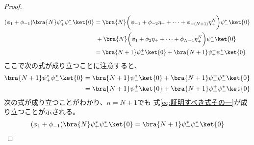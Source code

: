 {\begin{proof}
\begin{equation*}
\begin{split}
			(\phi_1 + \phi_{-1})\bra{N}\psi_+^*\psi_-^*\ket{0}
			&= \bra{N}\biggl(\phi_{-1} + \phi_{-2}\eta_+
				+\cdots+ \phi_{-(N+1)}\eta_+^N\biggr)\psi_-^*\ket{0} \\
			&\; + \bra{N}\biggl(\phi_1 + \phi_2\eta_+
				+\cdots+ \phi_{N+1}\eta_+^N\biggr)\psi_-^*\ket{0} \\
			&= \bra{N+1}\psi_-^+\ket{0}
				+ \bra{N+1}\psi_+^+\psi_-^*\ket{0} \\
		\end{split}\end{equation*}
		ここで次の式が成り立つことに注意すると、
		\begin{equation*}\begin{split}
			\bra{N+1}\psi_+^*\psi_-^*\ket{0} &= \bra{N+1}\psi_-^*\ket{0}
				+ \bra{N+1}\psi_+^+\psi_-^*\ket{0} \\
			&= \bra{N+1}\psi_-^+\ket{0} + \bra{N+1}\psi_+^+\psi_-^*\ket{0} \\
		\end{split}\end{equation*}
		次の式が成り立つことがわかり、$n=N+1$でも
		式\eqref{eq:証明すべき式その一}が成り立つことが示される。
		\begin{equation*}\begin{split}
			(\phi_1 + \phi_{-1})\bra{N}\psi_+^*\psi_-^*\ket{0}
			= \bra{N+1}\psi_+^*\psi_-^*\ket{0}
		\end{split}\end{equation*}
	\end{proof} %

}
